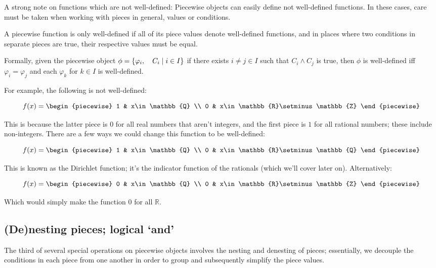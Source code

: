 A strong note on functions which are not well-defined: Piecewise objects can easily define not well-defined functions. In these cases, care must be taken when working with pieces in general, values or conditions.

\begin{theorem}
    A piecewise function is only well-defined if all of its piece values denote well-defined functions, and in places where two conditions in separate pieces are true, their respective values must be equal.

    Formally, given the piecewise object $\phi=\{\varphi_i,\quad C_i\mid i\in I\}$ if there exists $i\neq j\in I$ such that $C_i\land C_j$ is true, then $\phi$ is well-defined iff $\varphi_i=\varphi_j$ and each $\varphi_k$ for $k\in I$ is well-defined.

    For example, the following is not well-defined:

    $$
        f(x) = \begin{piecewise}
            1 & x\in\mathbb{Q} \\
            0 & x\in\mathbb{R}\setminus\mathbb{Z}
        \end{piecewise}
    $$

    This is because the latter piece is $0$ for all real numbers that aren't integers, and the first piece is $1$ for all rational numbers; these include non-integers. There are a few ways we could change this function to be well-defined:

    $$
        f(x) = \begin{piecewise}
            1 & x\in\mathbb{Q} \\
            0 & x\in\mathbb{R}\setminus\mathbb{Q}
        \end{piecewise}
    $$

    This is known as the Dirichlet function; it's the indicator function of the rationals (which we'll cover later on). Alternatively:

    $$
        f(x) = \begin{piecewise}
            0 & x\in\mathbb{Q} \\
            0 & x\in\mathbb{R}\setminus\mathbb{Z}
        \end{piecewise}
    $$

    Which would simply make the function $0$ for all $\mathbb{R}$.
\end{theorem}

\subsection{(De)nesting pieces; logical `and'}
The third of several special operations on piecewise objects involves the nesting and denesting of pieces; essentially, we decouple the conditions in each piece from one another in order to group and subsequently simplify the piece values.


